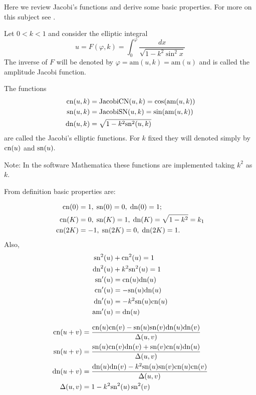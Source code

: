 Here we review Jacobi's functions and derive some basic properties. For more on this subject see \cite{armitage-2006}.

Let $0<k<1$ and consider the elliptic integral
\[u=F(\varphi,k)=\int_{0}^{\varphi} \frac {dx}{\sqrt {1-k^2   \sin^2 x  
}} \]
The inverse of $F$ will be denoted by $\varphi=\text{am}(u,k)=\text{am}(u)$ and is called the amplitude Jacobi function.

The functions
\begin{align*}
 \mathrm{cn}(u,k)&=\mathrm{JacobiCN}(u,k)=\cos(\mathrm{am}(u,k))\\ \;
 \mathrm{sn}(u,k)&=\mathrm{JacobiSN}(u,k)=\sin(\mathrm{am}(u,k))\\
 \mathrm{dn}(u,k)&=\sqrt{1-k^2\mathrm{sn}^2(u,k)}
 \end{align*}
\noindent  are called the Jacobi's elliptic  functions. 
For $k$ fixed they will denoted simply by $\mathrm{cn}(u)$ and $\mathrm{sn}(u).$


\noindent Note: In the software Mathematica these functions are implemented taking $k^2$ as $k$.


From definition basic properties are:

\begin{align*}
\mathrm{cn}(0)&=1,\; \mathrm{sn}(0)=0, \; \mathrm{dn}(0)=1;\\
\mathrm{cn}(K)&=0,\; \mathrm{sn}(K)=1, \; \mathrm{dn}(K)=\sqrt{1-k^2}=k_1\\
\mathrm{cn}(2K)&=-1,\; \mathrm{sn}(2K)=0, \; \mathrm{dn}(2K)=1.
\end{align*}
Also,
\begin{align*}
 \mathrm{sn}^2(u)  &+\mathrm{cn}^2(u) =1\\
 \mathrm{dn}^2 (u)&+k^2\mathrm{sn}^2(u)  =1\\
\mathrm{sn}'(u)&=\mathrm{cn}(u)\mathrm{dn}(u)\\
\mathrm{cn}'(u)&=-\mathrm{sn}(u)\mathrm{dn}(u)\\
\mathrm{dn}'(u)&=-k^2\mathrm{sn}(u)\mathrm{cn}(u)\\
\text{am}'(u)&=\mathrm{dn}(u)
\end{align*}

\begin{align*}
    \mathrm{cn}(u+v)&=\frac{\mathrm{cn}(u)\mathrm{cn}(v)-\mathrm{sn}(u)\mathrm{sn}(v)\mathrm{dn}(u)\mathrm{dn}(v)}{\Delta(u,v)}\\
    \mathrm{sn}(u+v)&=\frac{\mathrm{sn}(u)\mathrm{cn}(v)\mathrm{dn}(v)+\mathrm{sn}(v)\mathrm{cn}(u)\mathrm{dn}(u) }{\Delta(u,v)}\\
    \mathrm{dn}(u+v)&=\frac{\mathrm{dn}(u)\mathrm{dn}(v)-k^2\mathrm{sn}(u)\mathrm{sn}(v)\mathrm{cn}(u)\mathrm{cn}(v) }{\Delta(u,v)}\\
    \Delta(u,v)&=1-k^2\mathrm{sn}^2(u)\,\mathrm{sn}^2(v)
\end{align*}

